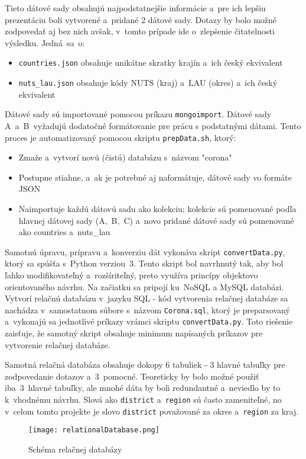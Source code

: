 \documentclass [11pt, a4paper]{article}
\begin{document}
Tieto dátové sady obsahujú najpodstatnejšie informácie a~pre ich lepšiu prezentáciu boli vytvorené a~pridané 2 dátové sady. Dotazy by bolo možné zodpovedať aj bez nich avšak, v~tomto prípade ide o~zlepšenie čitatelnosti výsledku. Jedná~sa~o:
\begin{itemize}
\item \texttt{countries.json} obsahuje unikátne skratky krajín a~ich český ekvivalent
\item \texttt{nuts\_lau.json} obsahuje kódy NUTS (kraj) a~LAU (okres) a~ich český ekvivalent
\end{itemize} 

Dátové sady sú importované pomocou príkazu \texttt{mongoimport}. Dátové sady A~a~B~vyžadujú dodatočné formátovanie pre prácu s podstatnými dátami. Tento proces je automatizovaný pomocou skriptu \texttt{prepData.sh}, ktorý:
\begin{itemize}
\item Zmaže a~vytvorí novú (čistú) databázu s~názvom "corona"
\item Postupne stiahne, a~ak je potrebné aj naformátuje, dátové sady vo formáte JSON
\item Naimportuje každú dátovú sadu ako kolekciu; kolekcie sú pomenované podľa hlavnej dátovej sady (A,~B,~C) a~novo pridané dátové sady sú pomenované ako countries a~nuts\_lau
\end{itemize}

Samotnú úpravu, prípravu a~konverziu dát vykonáva skript \texttt{convertData.py}, ktorý sa spúšťa s~Python verziou~3. Tento skript bol navrhnutý tak, aby bol ľahko modifikovateľný a~rozšíriteľný, preto využíva princípy objektovo orientovaného návrhu. Na začiatku sa pripojí ku~NoSQL a MySQL databázi. Vytvorí relačnú databázu v~jazyku SQL - kód vytvorenia relačnej databáze sa nachádza v~samostatnom súbore s~názvom \texttt{Corona.sql}, ktorý je preparsovaný a~vykonajú sa jednotlivé príkazy vrámci skriptu \texttt{convertData.py}. Toto riešenie zaisťuje, že samotný skript obsahuje minimum  napísaných príkazov pre vytvorenie relačnej databáze.

Samotná relačná databáza obsahuje dokopy 6 tabuliek - 3 hlavné tabuľky pre zodpovedanie dotazov a~3~pomocné. Teoreticky by bolo možné použiť iba~3~hlavné tabuľky, ale mnohé dáta by boli redundantné a~neviedlo by to k~vhodnému návrhu. Slová ako \texttt{district} a~\texttt{region} sú často zameniteľné, no v~celom tomto projekte je slovo \texttt{district} považované za okres a~\texttt{region} za kraj.

\begin{figure}[H]
\begin{center}
\texttt{[image: relationalDatabase.png]}
\caption{Schéma relačnej databázy}
\end{center}
\end{figure}
\end{document}
